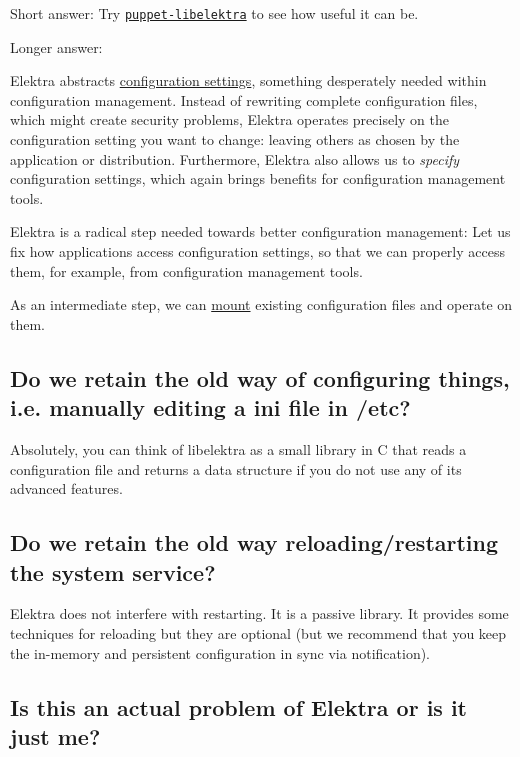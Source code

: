 Short answer\+: Try \href{https://puppet.libelektra.org}{\tt puppet-\/libelektra} to see how useful it can be.

Longer answer\+:

Elektra abstracts \hyperlink{md_doc_help_elektra-glossary_doc_help_elektra-glossary_md}{configuration settings}, something desperately needed within configuration management. Instead of rewriting complete configuration files, which might create security problems, Elektra operates precisely on the configuration setting you want to change\+: leaving others as chosen by the application or distribution. Furthermore, Elektra also allows us to {\itshape specify} configuration settings, which again brings benefits for configuration management tools.

Elektra is a radical step needed towards better configuration management\+: Let us fix how applications access configuration settings, so that we can properly access them, for example, from configuration management tools.

As an intermediate step, we can \hyperlink{md_doc_help_elektra-mounting_doc_help_elektra-mounting_md}{mount} existing configuration files and operate on them.

\subsection*{Do we retain the old way of configuring things, i.\+e. manually editing a ini file in /etc?}

Absolutely, you can think of libelektra as a small library in C that reads a configuration file and returns a data structure if you do not use any of its advanced features.

\subsection*{Do we retain the old way reloading/restarting the system service?}

Elektra does not interfere with restarting. It is a passive library. It provides some techniques for reloading but they are optional (but we recommend that you keep the in-\/memory and persistent configuration in sync via notification).

\subsection*{Is this an actual problem of Elektra or is it just me?}

